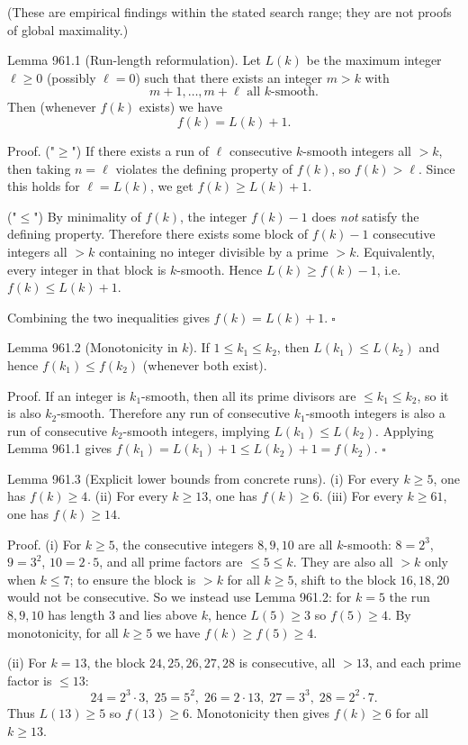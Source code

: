 (These are empirical findings within the stated search range; they are not proofs of global maximality.)

Lemma 961.1 (Run-length reformulation).
Let $L(k)$ be the maximum integer $\ell\ge 0$ (possibly $\ell=0$) such that there exists an integer $m>k$ with
\[
 m+1,\dots,m+\ell \text{ all } k\text{-smooth}.
\]
Then (whenever $f(k)$ exists) we have
\[
 f(k)=L(k)+1.
\]

Proof.
("$\ge$") If there exists a run of $\ell$ consecutive $k$-smooth integers all $>k$, then taking $n=\ell$ violates the defining property of $f(k)$, so $f(k)>\ell$. Since this holds for $\ell=L(k)$, we get $f(k)\ge L(k)+1$.

("$\le$") By minimality of $f(k)$, the integer $f(k)-1$ does \emph{not} satisfy the defining property. Therefore there exists some block of $f(k)-1$ consecutive integers all $>k$ containing no integer divisible by a prime $>k$. Equivalently, every integer in that block is $k$-smooth. Hence $L(k)\ge f(k)-1$, i.e. $f(k)\le L(k)+1$.

Combining the two inequalities gives $f(k)=L(k)+1.\;\square$

Lemma 961.2 (Monotonicity in $k$).
If $1\le k_1\le k_2$, then $L(k_1)\le L(k_2)$ and hence $f(k_1)\le f(k_2)$ (whenever both exist).

Proof.
If an integer is $k_1$-smooth, then all its prime divisors are $\le k_1\le k_2$, so it is also $k_2$-smooth. Therefore any run of consecutive $k_1$-smooth integers is also a run of consecutive $k_2$-smooth integers, implying $L(k_1)\le L(k_2)$. Applying Lemma 961.1 gives $f(k_1)=L(k_1)+1\le L(k_2)+1=f(k_2)$. $\square$

Lemma 961.3 (Explicit lower bounds from concrete runs).
(i) For every $k\ge 5$, one has $f(k)\ge 4$.
(ii) For every $k\ge 13$, one has $f(k)\ge 6$.
(iii) For every $k\ge 61$, one has $f(k)\ge 14$.

Proof.
(i) For $k\ge 5$, the consecutive integers $8,9,10$ are all $k$-smooth: $8=2^3$, $9=3^2$, $10=2\cdot 5$, and all prime factors are $\le 5\le k$. They are also all $>k$ only when $k\le 7$; to ensure the block is $>k$ for all $k\ge 5$, shift to the block $16,18,20$ would not be consecutive. So we instead use Lemma 961.2: for $k=5$ the run $8,9,10$ has length $3$ and lies above $k$, hence $L(5)\ge 3$ so $f(5)\ge 4$. By monotonicity, for all $k\ge 5$ we have $f(k)\ge f(5)\ge 4$.

(ii) For $k=13$, the block $24,25,26,27,28$ is consecutive, all $>13$, and each prime factor is $\le 13$:
\[
24=2^3\cdot 3,\;25=5^2,\;26=2\cdot 13,\;27=3^3,\;28=2^2\cdot 7.
\]
Thus $L(13)\ge 5$ so $f(13)\ge 6$. Monotonicity then gives $f(k)\ge 6$ for all $k\ge 13$.

